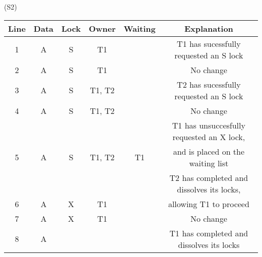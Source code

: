 \documentclass[12pt]{article}
\begin{document}
\indent(S2)\\[-1.5em]
\begin{table}[h!]
\centering
\begin{tabular}{c|c|c|c|c|c}
\bottomrule
\rowcolor{gray!50}
Line & Data & Lock & Owner & Waiting & Explanation\\\toprule
1 & A & S & T1 &   & T1 has sucessfully requested an S lock\\
2 & A & S & T1 &   & No change\\
3 & A & S & T1, T2 &   & T2 has sucessfully requested an S lock\\
4 & A & S & T1, T2 &   & No change\\

&&&&& T1 has unsuccesfully requested an X lock,\setcounter{rownum}{1}\\
\multirow{-2}{*}{5} & \multirow{-2}{*}{A} &\multirow{-2}{*}{S}&\multirow{-2}{*}{T1, T2}&\multirow{-2}{*}{T1}& and is placed on the waiting list\\

&&&&& T2 has completed and dissolves its locks,\setcounter{rownum}{2}\\
\multirow{-2}{*}{6} & \multirow{-2}{*}{A} &\multirow{-2}{*}{X}&\multirow{-2}{*}{T1}&& allowing T1 to proceed\\

7 & A & X & T1 &   & No change\\
8 & A &  &  &   & T1 has completed and dissolves its locks\\\bottomrule
\end{tabular}
\end{table}\\
\end{document}
